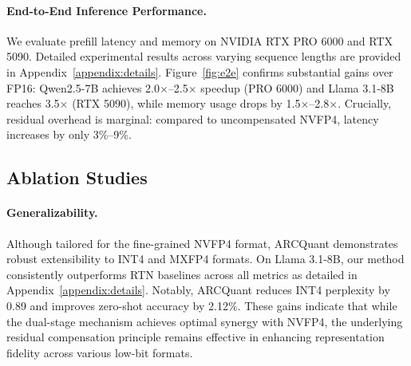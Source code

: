 \documentclass[11pt]{article}
\begin{document}
\paragraph{End-to-End Inference Performance.} We evaluate prefill latency and memory on NVIDIA RTX PRO 6000 and RTX 5090. Detailed experimental results across varying sequence lengths are provided in Appendix~\ref{appendix:details}. Figure~\ref{fig:e2e} confirms substantial gains over FP16: Qwen2.5-7B achieves 2.0$\times$--2.5$\times$ speedup (PRO 6000) and Llama 3.1-8B reaches 3.5$\times$ (RTX 5090), while memory usage drops by 1.5$\times$--2.8$\times$. Crucially, residual overhead is marginal: compared to uncompensated NVFP4, latency increases by only 3\%--9\%.



\subsection{Ablation Studies}


\paragraph{Generalizability.} Although tailored for the fine-grained NVFP4 format, ARCQuant demonstrates robust extensibility to INT4 and MXFP4 formats. On Llama 3.1-8B, our method consistently outperforms RTN baselines across all metrics as detailed in Appendix~\ref{appendix:details}. Notably, ARCQuant reduces INT4 perplexity by 0.89 and improves zero-shot accuracy by 2.12\%. These gains indicate that while the dual-stage mechanism achieves optimal synergy with NVFP4, the underlying residual compensation principle remains effective in enhancing representation fidelity across various low-bit formats.
\end{document}
